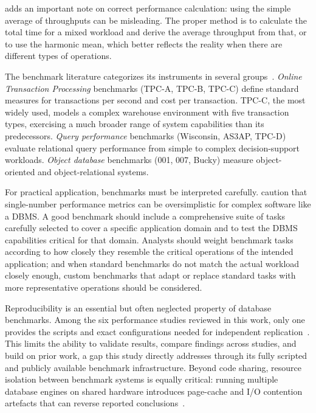 \cite{Silberschatz2020} adds an important note on correct performance calculation: using
the simple average of throughputs can be misleading. The proper method is to calculate the
total time for a mixed workload and derive the average throughput from that, or to use the
harmonic mean, which better reflects the reality when there are different types of operations.

The benchmark literature categorizes its instruments in several groups~\citep{Ramakrishnan2003}.
\textit{Online Transaction Processing} benchmarks (TPC-A, TPC-B, TPC-C) define standard
measures for transactions per second and cost per transaction. TPC-C, the most widely used,
models a complex warehouse environment with five transaction types, exercising a much broader
range of system capabilities than its predecessors. \textit{Query performance} benchmarks
(Wisconsin, AS3AP, TPC-D) evaluate relational query performance from simple to complex
decision-support workloads. \textit{Object database} benchmarks (001, 007, Bucky) measure
object-oriented and object-relational systems.

For practical application, benchmarks must be interpreted carefully.
\cite{Ramakrishnan2003} caution that single-number performance metrics can be oversimplistic
for complex software like a DBMS. A good benchmark should include a comprehensive suite of
tasks carefully selected to cover a specific application domain and to test the DBMS capabilities
critical for that domain. Analysts should weight benchmark tasks according to how closely they
resemble the critical operations of the intended application; and when standard benchmarks
do not match the actual workload closely enough, custom benchmarks that adapt or replace
standard tasks with more representative operations should be considered.

Reproducibility is an essential but often neglected property of database benchmarks.
Among the six performance studies reviewed in this work, only one provides the scripts
and exact configurations needed for independent
replication~\citep{pereira2023mulletbench}. This limits the ability to validate results,
compare findings across studies, and build on prior work, a gap this study directly
addresses through its fully scripted and publicly available benchmark infrastructure.
Beyond code sharing, resource isolation between benchmark systems is equally critical:
running multiple database engines on shared hardware introduces page-cache and I/O
contention artefacts that can reverse reported conclusions~\citep{shapira2016pitfalls}.
